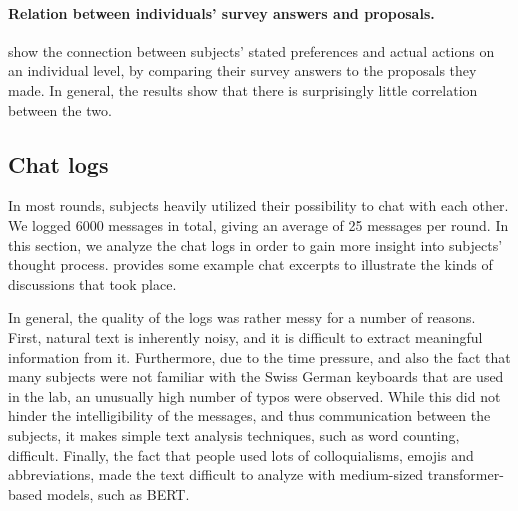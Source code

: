 \paragraph{Relation between individuals' survey answers and proposals.}  show the connection between subjects' stated preferences and actual actions on an individual level, by comparing their survey answers to the proposals they made. In general, the results show that there is surprisingly little correlation between the two. 

\subsection{Chat logs} \label{sec:chat}

In most rounds, subjects heavily utilized their possibility to chat with each other. We logged 6000 messages in total, giving an average of 25 messages per round. In this section, we analyze the chat logs in order to gain more insight into subjects' thought process.  provides some example chat excerpts to illustrate the kinds of discussions that took place.

In general, the quality of the logs was rather messy for a number of reasons. First, natural text is inherently noisy, and it is difficult to extract meaningful information from it. Furthermore, due to the time pressure, and also the fact that many subjects were not familiar with the Swiss German keyboards that are used in the lab, an unusually high number of typos were observed. While this did not hinder the intelligibility of the messages, and thus communication between the subjects, it makes simple text analysis techniques, such as word counting, difficult. Finally, the fact that people used lots of colloquialisms, emojis and abbreviations, made the text difficult to analyze with medium-sized transformer-based models, such as BERT.

